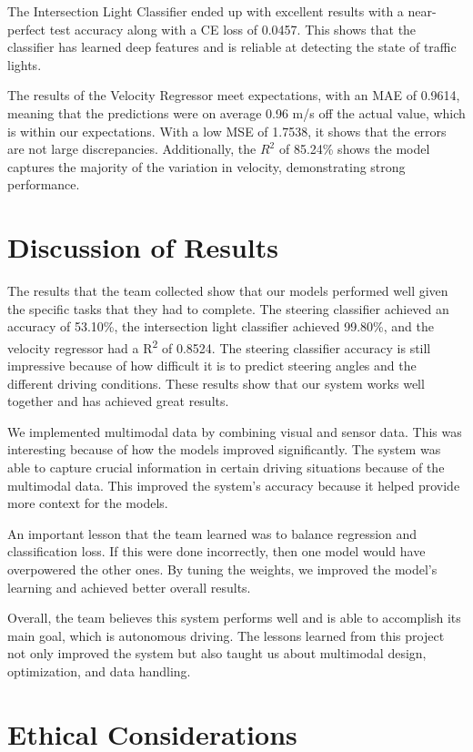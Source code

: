 \documentclass{article} %
\begin{document}
The Intersection Light Classifier ended up with excellent results with a near-perfect test accuracy along with a CE loss of 0.0457. 
This shows that the classifier has learned deep features and is reliable at detecting the state of traffic lights. 

The results of the Velocity Regressor meet expectations, with an MAE of 0.9614, meaning that the predictions were on average 0.96 m/s 
off the actual value, which is within our expectations. With a low MSE of 1.7538, it shows that the errors are not large discrepancies. 
Additionally, the $R^2$ of 85.24\% shows the model captures the majority of the variation in velocity, demonstrating strong performance. 


\section{Discussion of Results}

The results that the team collected show that our models performed well given the specific tasks that
they had to complete. The steering classifier achieved an accuracy of 53.10\%, the intersection light
classifier achieved 99.80\%, and the velocity regressor had a R\textsuperscript{2} of 0.8524. The steering
classifier accuracy is still impressive because of how difficult it is to predict steering angles and
the different driving conditions. These results show that our system works well together and has
achieved great results.

We implemented multimodal data by combining visual and sensor data. This was interesting because of how
the models improved significantly. The system was able to capture crucial information in certain driving
situations because of the multimodal data. This improved the system’s accuracy because it helped provide
more context for the models.

An important lesson that the team learned was to balance regression and classification loss. If this
were done incorrectly, then one model would have overpowered the other ones. By tuning the weights,
we improved the model's learning and achieved better overall results.

Overall, the team believes this system performs well and is able to accomplish its main goal, which is
autonomous driving. The lessons learned from this project not only improved the system but also taught
us about multimodal design, optimization, and data handling.


\section{Ethical Considerations}
\end{document}
